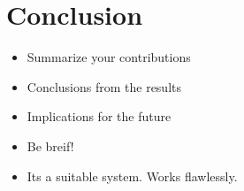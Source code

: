 \section{Conclusion}

\begin{itemize}
\item Summarize your contributions
\item Conclusions from the results
\item Implications for the future 
\item Be breif!

\item Its a suitable system. Works flawlessly.
\end{itemize}

